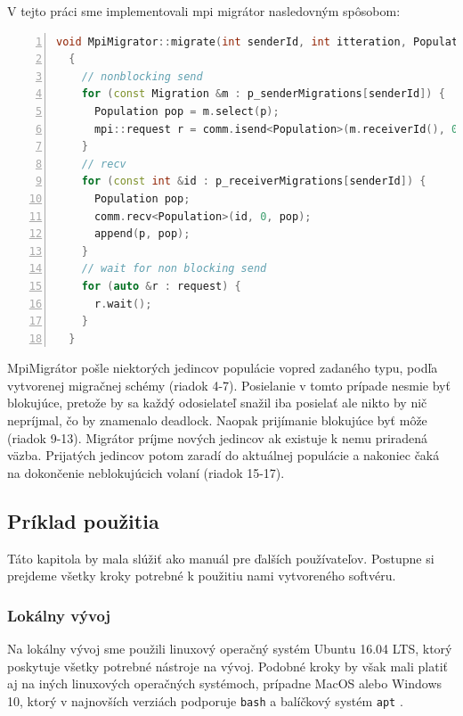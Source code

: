 V tejto práci sme implementovali \acrshort{mpi} migrátor nasledovným spôsobom:
\begin{lstlisting}[language=c++, caption={Kód MpiMigrator-a}, numbers={left}, label={lst:mpi-mig}]
  void MpiMigrator::migrate(int senderId, int itteration, Population &population)
  {
    // nonblocking send
    for (const Migration &m : p_senderMigrations[senderId]) {
      Population pop = m.select(p);
      mpi::request r = comm.isend<Population>(m.receiverId(), 0, pop);
    }
    // recv
    for (const int &id : p_receiverMigrations[senderId]) {
      Population pop;
      comm.recv<Population>(id, 0, pop);
      append(p, pop);
    }
    // wait for non blocking send
    for (auto &r : request) {
      r.wait();
    }
  }
\end{lstlisting}
MpiMigrátor pošle niektorých jedincov populácie vopred zadaného typu, podľa vytvorenej migračnej schémy (riadok 4-7).
Posielanie v tomto prípade nesmie byť blokujúce, pretože by sa každý odosielateľ snažil iba posielať ale nikto by nič nepríjmal, čo by znamenalo deadlock.
Naopak prijímanie blokujúce byť môže (riadok 9-13). Migrátor príjme nových jedincov ak existuje k nemu priradená väzba.
Prijatých jedincov potom zaradí do aktuálnej populácie a nakoniec čaká na dokončenie neblokujúcich volaní (riadok 15-17).

\subsection{Príklad použitia}
Táto kapitola by mala slúžiť ako manuál pre ďalších používateľov.
Postupne si prejdeme všetky kroky potrebné k použitiu nami vytvoreného softvéru.

\subsubsection{Lokálny vývoj}
\label{subsec:local-dev}
Na lokálny vývoj sme použili linuxový operačný systém Ubuntu 16.04 LTS, ktorý poskytuje všetky potrebné nástroje na vývoj.
Podobné kroky by však mali platiť aj na iných linuxových operačných systémoch, prípadne MacOS alebo Windows 10,
ktorý v najnovších verziách podporuje \texttt{bash} a balíčkový systém \texttt{apt} \cite{bash-on-win}.

